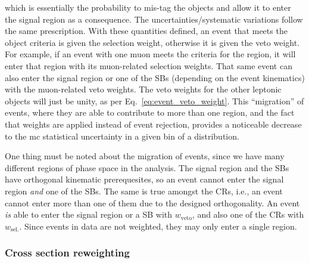 which is essentially the probability to mis-tag the objects and allow it to enter the signal region as a consequence. The uncertainties/systematic variations follow the same prescription. With these quantities defined, an event that meets the object criteria is given the selection weight, otherwise it is given the veto weight. For example, if an event with one muon meets the criteria for the \singleMuCr region, it will enter that region with its muon-related selection weights. That same event can also enter the signal region or one of the \glspl{SB} (depending on the event kinematics) with the muon-related veto weights. The veto weights for the other leptonic objects will just be unity, as per Eq.~\ref{eq:event_veto_weight}. This ``migration'' of events, where they are able to contribute to more than one region, and the fact that weights are applied instead of event rejection, provides a noticeable decrease to the \acrlong{mc} statistical uncertainty in a given bin of a distribution.

One thing must be noted about the migration of events, since we have many different regions of phase space in the analysis. The signal region and the \glspl{SB} have orthogonal kinematic prerequesites, so an event cannot enter the signal region \emph{and} one of the \glspl{SB}. The same is true amongst the \glspl{CR}, i.e., an event cannot enter more than one of them due to the designed orthogonality. An event \emph{is} able to enter the signal region or a \gls{SB} with $w_{\mathrm{veto}}$, and also one of the \glspl{CR} with $w_{\mathrm{sel.}}$. Since events in data are not weighted, they may only enter a single region.




\subsubsection{Cross section reweighting}
\label{subsubsec:xs_weighting}

